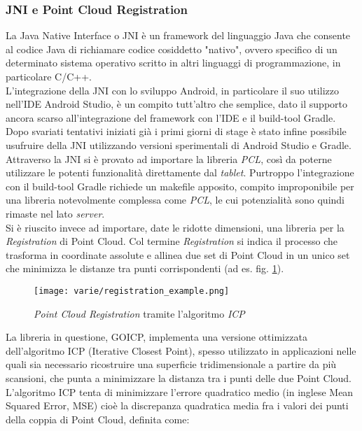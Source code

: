 \subsubsection{JNI e Point Cloud Registration}
\label{sec:registration}
La Java Native Interface o JNI è un framework del linguaggio Java che consente al codice Java di richiamare codice cosiddetto "nativo", ovvero specifico di un determinato sistema operativo scritto in altri linguaggi di programmazione, in particolare C/C++.\\
L'integrazione della JNI con lo sviluppo Android, in particolare il suo utilizzo nell'IDE Android Studio, è un compito tutt'altro che semplice, dato il supporto ancora scarso all'integrazione del framework con l'IDE e il build-tool Gradle.\\
Dopo svariati tentativi iniziati già i primi giorni di stage è stato infine possibile usufruire della JNI utilizzando versioni sperimentali di Android Studio e Gradle. \\
Attraverso la JNI si è provato ad importare la libreria \emph{PCL}, così da poterne utilizzare le potenti funzionalità direttamente dal \emph{tablet}. Purtroppo l'integrazione con il build-tool Gradle richiede un makefile apposito, compito improponibile per una libreria notevolmente complessa come \emph{PCL}, le cui potenzialità sono quindi rimaste nel lato \emph{server}.\\
Si è riuscito invece ad importare, date le ridotte dimensioni, una libreria per la \emph{Registration} di Point Cloud. Col termine \emph{Registration} si indica il processo che trasforma in coordinate assolute e allinea due set di Point Cloud in un unico set che minimizza le distanze tra punti corrispondenti (ad es. fig. \ref{fig:reg_example}).
\begin{figure}[!h] 
    \centering 
    \texttt{[image: varie/registration\_example.png]} 
    \caption{\emph{Point Cloud Registration} tramite l'algoritmo \emph{ICP}}
    \label{fig:reg_example}
\end{figure}
\newline
La libreria in questione, GOICP, implementa una versione ottimizzata dell'algoritmo ICP (Iterative Closest Point), spesso utilizzato in applicazioni nelle quali sia necessario ricostruire una superficie tridimensionale a partire da più scansioni, che punta a minimizzare la distanza tra i punti delle due Point Cloud.\\
L'algoritmo ICP tenta di minimizzare l'errore quadratico medio (in inglese Mean Squared Error, MSE) cioè la discrepanza quadratica media fra i valori dei punti della coppia di Point Cloud, definita come:
